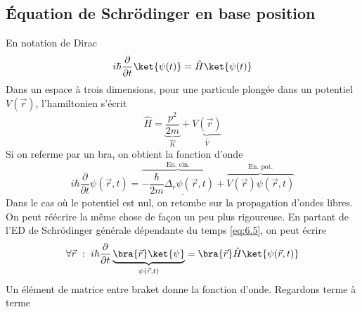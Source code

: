 	\subsection{Équation de Schrödinger en base position}
	En notation de Dirac
	\begin{equation}
	i\hbar\frac{\partial}{\partial t}\ket{\psi(t)} = \hat{H}\ket{\psi(t)}
	\label{eq:6.5}
	\end{equation}
	Dans un espace à trois dimensions, pour une particule plongée dans un potentiel $V(\vec r)$, l'hamiltonien 
	s'écrit
	\begin{equation}
	\hat{H} = \underbrace{\frac{p^2}{2m}}_{\hat{K}} + \underbrace{V(\vec{r})}_{\hat{V}}
	\end{equation}
	Si on referme par un bra, on obtient la fonction d'onde
	\begin{equation}
\underline{i\hbar \frac{\partial}{\partial t}\psi(\vec{r},t) = \overbrace{-\frac{\hbar}
	{2m}\Delta_r\psi(\vec{r},t)}^{\text{En. cin.}} + \overbrace{V(\vec{r})\psi(\vec{r},t)}^{\text{En. pot.}}}
	\end{equation}
	Dans le cas où le potentiel est nul, on retombe sur la propagation d'ondes libres.
	On peut réécrire la même chose de façon un peu plus rigoureuse. En partant de l'ED de Schrödinger 
	générale dépendante du temps \eqref{eq:6.5}, on peut écrire
	\begin{equation}
	\forall\vec{r}\ :\ i\hbar\frac{\partial}{\partial t}\underbrace{\bra{\vec{r}}\ket{\psi}}_{\psi(\vec{r},
	t)} = \bra{\vec{r}}\hat{H}\ket{\psi(\vec{r},t)}
	\end{equation}
	Un élément de matrice entre braket donne la fonction d'onde. Regardons terme à terme
